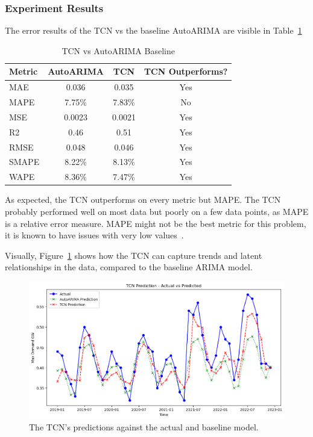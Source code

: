 \documentclass{ieeeaccess}
\begin{document}
\subsubsection{Experiment Results}

The error results of the TCN vs the baseline AutoARIMA are visible in Table~\ref{tab:metrics_comparison}
\begin{table}[h] 
\centering
\caption{TCN vs AutoARIMA Baseline}
\begin{tabular}{lccc}
\hline
Metric & AutoARIMA & TCN & TCN Outperforms? \\
\hline
MAE & 0.036 & 0.035 & Yes \\
MAPE & 	7.75\% & 7.83\% & No \\
MSE & 0.0023 & 0.0021 & Yes \\
R2 & 0.46 & 0.51 & Yes \\
RMSE & 0.048 & 0.046 & Yes \\
SMAPE & 8.22\% & 8.13\% & Yes \\
WAPE & 8.36\% & 7.47\% & Yes \\
\hline
\end{tabular}
\label{tab:metrics_comparison}
\end{table}

As expected, the TCN outperforms on every metric but MAPE. The TCN probably performed well on most data but poorly on a few data points, as MAPE is a relative error measure. MAPE might not be the best metric for this problem, it is known to have issues with very low values~\cite{scikitMAPE}.

Visually, Figure~\ref{fig:tcnpredictions} shows how the TCN can capture trends and latent relationships in the data, compared to the baseline ARIMA model.
\begin{figure}[htb]
    \centering
    \includegraphics[width=\columnwidth]{Model-TCN/TCN_Actual_Vs_predicted.png}
    \caption{The TCN's predictions against the actual and baseline model.}
    \label{fig:tcnpredictions}
\end{figure}
\end{document}
